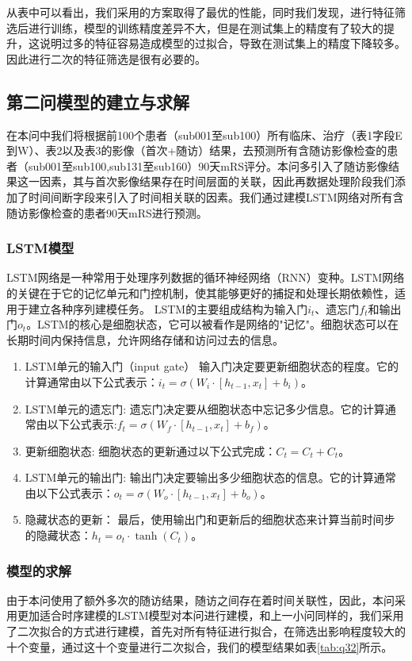 \documentclass[bwprint]{gmcmthesis}
\begin{document}
从表中可以看出，我们采用的方案取得了最优的性能，同时我们发现，进行特征筛选后进行训练，模型的训练精度差异不大，但是在测试集上的精度有了较大的提升，这说明过多的特征容易造成模型的过拟合，导致在测试集上的精度下降较多。因此进行二次的特征筛选是很有必要的。
\subsection{第二问模型的建立与求解}
在本问中我们将根据前100个患者（sub001至sub100）所有临床、治疗（表1字段E到W）、表2以及表3的影像（首次+随访）结果，去预测所有含随访影像检查的患者（sub001至sub100,sub131至sub160）90天mRS评分。本问多引入了随访影像结果这一因素，其与首次影像结果存在时间层面的关联，因此再数据处理阶段我们添加了时间间断字段来引入了时间相关联的因素。我们通过建模LSTM网络对所有含随访影像检查的患者90天mRS进行预测。
\subsubsection{LSTM模型}
LSTM网络是一种常用于处理序列数据的循环神经网络（RNN）变种。LSTM网络的关键在于它的记忆单元和门控机制，使其能够更好的捕捉和处理长期依赖性，适用于建立各种序列建模任务。
LSTM的主要组成结构为输入门$i_t$、遗忘门$f_t$和输出门$o_t$。LSTM的核心是细胞状态，它可以被看作是网络的"记忆"。细胞状态可以在长期时间内保持信息，允许网络存储和访问过去的信息。
\begin{enumerate}
    \item LSTM单元的输入门（input gate）
    输入门决定要更新细胞状态的程度。它的计算通常由以下公式表示：$i_t = \sigma(W_i \cdot [h_{t-1}, x_t] + b_i)$。
    \item LSTM单元的遗忘门:
    遗忘门决定要从细胞状态中忘记多少信息。它的计算通常由以下公式表示:$f_t = \sigma(W_f \cdot [h_{t-1}, x_t] + b_f)$。
    \item 更新细胞状态:
    细胞状态的更新通过以下公式完成：$C_t = C_t + C_t$。 
    \item LSTM单元的输出门:
    输出门决定要输出多少细胞状态的信息。它的计算通常由以下公式表示：$o_t = \sigma(W_o \cdot [h_{t-1}, x_t] + b_o)$。
    \item 隐藏状态的更新：
    最后，使用输出门和更新后的细胞状态来计算当前时间步的隐藏状态：$h_t = o_t \cdot \tanh(C_t)$。
\end{enumerate}
\subsubsection{模型的求解}
由于本问使用了额外多次的随访结果，随访之间存在着时间关联性，因此，本问采用更加适合时序建模的LSTM模型对本问进行建模，和上一小问同样的，我们采用了二次拟合的方式进行建模，首先对所有特征进行拟合，在筛选出影响程度较大的十个变量，通过这十个变量进行二次拟合，我们的模型结果如表\ref{tab:q32}所示。
\end{document}
